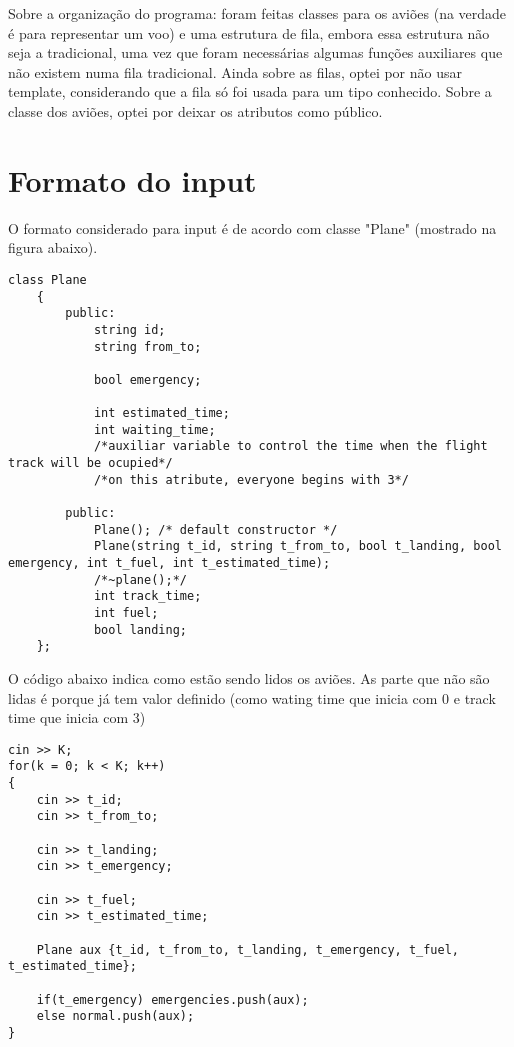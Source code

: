 \documentclass[a4paper,11pt]{article}
\theoremstyle{mytheor}
\begin{document}
Sobre a organização do programa: foram feitas classes para os aviões (na verdade é para representar um voo) e uma estrutura de fila, embora essa estrutura não seja a tradicional, uma vez que foram necessárias algumas funções auxiliares que não existem numa fila tradicional. Ainda sobre as filas, optei por não usar template, considerando que a fila só foi usada para um tipo conhecido. Sobre a classe dos aviões, optei por deixar os atributos como público. \newline

\section*{Formato do input}

O formato considerado para input é de acordo com classe "Plane" (mostrado na figura abaixo).\newline

\begin{lstlisting}[label={list:first},caption= Parte do código em plane.h.]
    class Plane
    {
        public:
            string id;
            string from_to;
    
            bool emergency;
    
            int estimated_time;
            int waiting_time;
            /*auxiliar variable to control the time when the flight track will be ocupied*/
            /*on this atribute, everyone begins with 3*/
    
        public:
            Plane(); /* default constructor */
            Plane(string t_id, string t_from_to, bool t_landing, bool emergency, int t_fuel, int t_estimated_time);
            /*~plane();*/
            int track_time;
            int fuel;
            bool landing;
    };
\end{lstlisting}


O código abaixo indica como estão sendo lidos os aviões. As parte que não são lidas é porque já tem valor definido (como wating time que inicia com 0 e track time que inicia com 3) \newline


\begin{lstlisting}[label={list:first},caption= Parte do código em airport.cpp que lê os aviões (C++).]
cin >> K;
for(k = 0; k < K; k++)
{
    cin >> t_id;
    cin >> t_from_to;

    cin >> t_landing;
    cin >> t_emergency;

    cin >> t_fuel;
    cin >> t_estimated_time;

    Plane aux {t_id, t_from_to, t_landing, t_emergency, t_fuel, t_estimated_time};
        
    if(t_emergency) emergencies.push(aux);
    else normal.push(aux);
}
\end{lstlisting}
\end{document}

